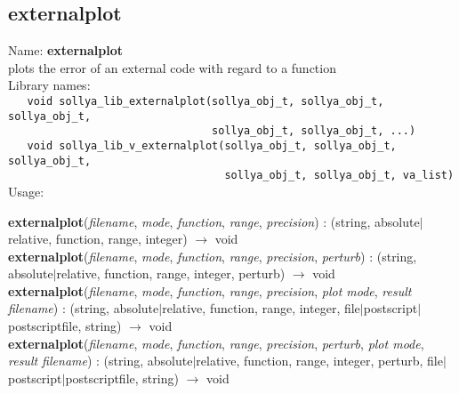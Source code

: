 \subsection{externalplot}
\label{labexternalplot}
\noindent Name: \textbf{externalplot}\\
\phantom{aaa}plots the error of an external code with regard to a function\\[0.2cm]
\noindent Library names:\\
\verb|   void sollya_lib_externalplot(sollya_obj_t, sollya_obj_t, sollya_obj_t,|\\
\verb|                                sollya_obj_t, sollya_obj_t, ...)|\\
\verb|   void sollya_lib_v_externalplot(sollya_obj_t, sollya_obj_t, sollya_obj_t,|\\
\verb|                                  sollya_obj_t, sollya_obj_t, va_list)|\\[0.2cm]
\noindent Usage: 
\begin{center}
\textbf{externalplot}(\emph{filename}, \emph{mode}, \emph{function}, \emph{range}, \emph{precision}) : (\textsf{string}, \textsf{absolute$|$relative}, \textsf{function}, \textsf{range}, \textsf{integer}) $\rightarrow$ \textsf{void}\\
\textbf{externalplot}(\emph{filename}, \emph{mode}, \emph{function}, \emph{range}, \emph{precision}, \emph{perturb}) : (\textsf{string}, \textsf{absolute$|$relative}, \textsf{function}, \textsf{range}, \textsf{integer}, \textsf{perturb}) $\rightarrow$ \textsf{void}\\
\textbf{externalplot}(\emph{filename}, \emph{mode}, \emph{function}, \emph{range}, \emph{precision}, \emph{plot mode}, \emph{result filename}) : (\textsf{string}, \textsf{absolute$|$relative}, \textsf{function}, \textsf{range}, \textsf{integer}, \textsf{file$|$postscript$|$postscriptfile}, \textsf{string}) $\rightarrow$ \textsf{void}\\
\textbf{externalplot}(\emph{filename}, \emph{mode}, \emph{function}, \emph{range}, \emph{precision}, \emph{perturb}, \emph{plot mode}, \emph{result filename}) : (\textsf{string}, \textsf{absolute$|$relative}, \textsf{function}, \textsf{range}, \textsf{integer}, \textsf{perturb}, \textsf{file$|$postscript$|$postscriptfile}, \textsf{string}) $\rightarrow$ \textsf{void}\\
\end{center}

